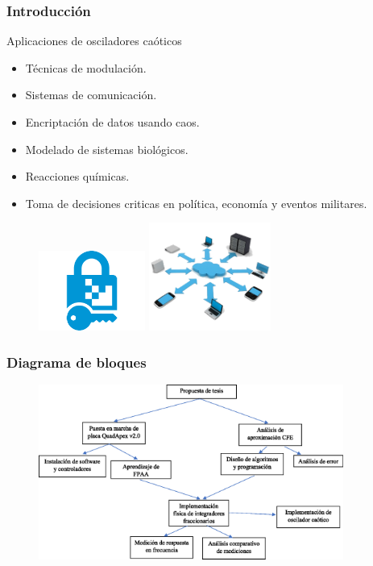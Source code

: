 \documentclass[10pt]{beamer}
\begin{document}
	
		\begin{frame}
		\frametitle{Introducción}
		\begin{block}{Aplicaciones de osciladores caóticos}
			\begin{itemize}
				\item Técnicas de modulación.
				\item Sistemas de comunicación.
				\item Encriptación de datos usando caos.
				\item Modelado de sistemas biológicos.
				\item Reacciones químicas.
				\item Toma de decisiones criticas en política, economía y eventos militares.
				\end{itemize}
		\end{block}

\begin{figure}[!h]
	\begin{minipage}[c]{0.45\textwidth}
		\centering
		\includegraphics[width = 3.5cm]{encrypt.png}
	\end{minipage} \hfill \begin{minipage}[c]{0.45\textwidth}
		\centering
		\includegraphics[width = 4cm]{comunication.png}
	\end{minipage}
\end{figure}
	\end{frame}
	
	\begin{frame}
		\frametitle{Diagrama de bloques}
		\begin{figure}[hbtp]
			\centering
			\includegraphics[width = 10cm]{diagrama_de_bloques.eps}
		\end{figure}
	\end{frame}
\end{document}
